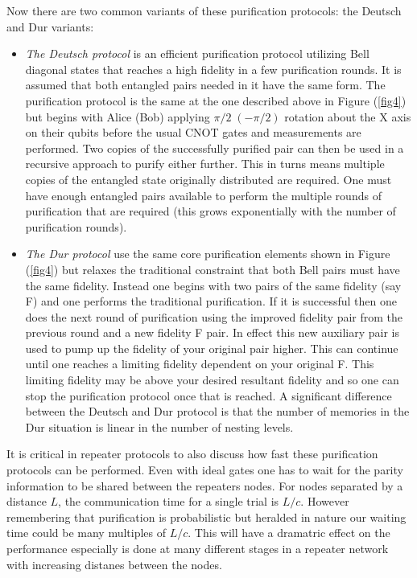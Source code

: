\documentclass[twocolumn, aps, rmp, amsmath, amssymb, nofootinbib, superscriptaddress, longbibliography, floatfix, table-of-contents, eqsecnum]{revtex4-1}
\begin{document}
Now there are two common variants of these purification protocols: the Deutsch  and Dur variants:
\begin{itemize}
\item {\it The Deutsch protocol} \cite{Deutsch98} is an efficient purification protocol utilizing Bell diagonal states that reaches a high fidelity in a few purification rounds. It is assumed that both entangled pairs needed in it have the same form. The purification protocol is the same at the one described above in Figure (\ref{fig4}) but begins with Alice (Bob) applying $\pi/2\;(-\pi/2)$ rotation about the X axis on their qubits before the usual CNOT gates and measurements are performed. Two copies of the successfully purified pair can then be used in a recursive approach to purify either further. This in turns means multiple copies of the entangled state originally distributed are required. One must have enough entangled pairs available to perform the multiple rounds of purification that are required (this grows exponentially with the number of purification rounds). 

\item {\it The Dur protocol} \cite{dur98} use the same core purification elements shown in Figure (\ref{fig4}) but relaxes the traditional constraint that both Bell pairs must have the same fidelity. Instead one begins with two pairs of the same fidelity (say F) and one performs the traditional purification. If it is successful then one does the next round of purification using the improved fidelity pair from the previous round and a new fidelity F pair. In effect this new auxiliary pair is used to pump up the fidelity of  your original pair higher. This can continue until one reaches a  limiting fidelity dependent on your  original F. This limiting fidelity may be above your desired resultant fidelity and so one can stop the purification protocol once that is reached. A significant difference between the Deutsch and Dur protocol is that the number of memories in the Dur situation is linear in the number of nesting levels.
\end{itemize}
It is critical in repeater protocols to also discuss how fast these purification protocols can be performed. Even with ideal gates one  has to wait for the parity information to be shared between the repeaters nodes. For nodes separated by a distance $L$, the communication time for a single trial is $L/c$. However remembering that  purification is probabilistic but heralded in nature our waiting time could be many multiples of  $L/c$. This will have a dramatric effect on the performance especially is done at many different stages in a repeater network with increasing distanes between the nodes.
\end{document}
